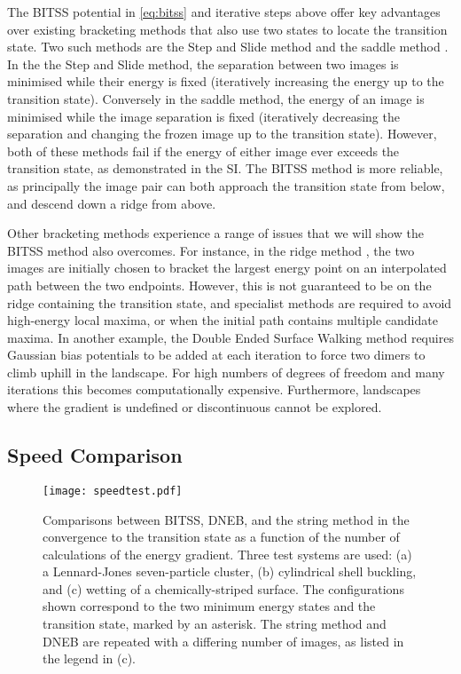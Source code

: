 \documentclass[twocolumn,10pt]{revtex4}
\begin{document}
The BITSS potential in \cref{eq:bitss} and iterative steps above offer key advantages over existing bracketing methods that also use two states to locate the transition state.
Two such methods are the Step and Slide method \cite{Miron2001} and the saddle method \cite{Dewar1984}.
In the the Step and Slide method, the separation between two images is minimised while their energy is fixed (iteratively increasing the energy up to the transition state).
Conversely in the saddle method, the energy of an image is minimised while the image separation is fixed (iteratively decreasing the separation and changing the frozen image up to the transition state).
However, both of these methods fail if the energy of either image ever exceeds the transition state, as demonstrated in the SI.
The BITSS method is more reliable, as principally the image pair can both approach the transition state from below, and descend down a ridge from above.

Other bracketing methods experience a range of issues that we will show the BITSS method also overcomes.
For instance, in the ridge method \cite{Ionova1993}, the two images are initially chosen to bracket the largest energy point on an interpolated path between the two endpoints.
However, this is not guaranteed to be on the ridge containing the transition state, and specialist methods are required to avoid high-energy local maxima, or when the initial path contains multiple candidate maxima.
In another example, the Double Ended Surface Walking method \cite{Zhang2013} requires Gaussian bias potentials to be added at each iteration to force two dimers to climb uphill in the landscape.
For high numbers of degrees of freedom and many iterations this becomes computationally expensive.
Furthermore, landscapes where the gradient is undefined or discontinuous cannot be explored.


\subsection{Speed Comparison}
\begin{figure*}[tb]
  \texttt{[image: speedtest.pdf]}
  \caption{\label{fig:speedtest}
    Comparisons between BITSS, DNEB, and the string method in the convergence to the transition state as a function of the number of calculations of the energy gradient.
    Three test systems are used: (a) a Lennard-Jones seven-particle cluster, (b) cylindrical shell buckling, and (c) wetting of a chemically-striped surface.
    The configurations shown correspond to the two minimum energy states and the transition state, marked by an asterisk.
    The string method and DNEB are repeated with a differing number of images, as listed in the legend in (c).
  }
\end{figure*}
\end{document}

